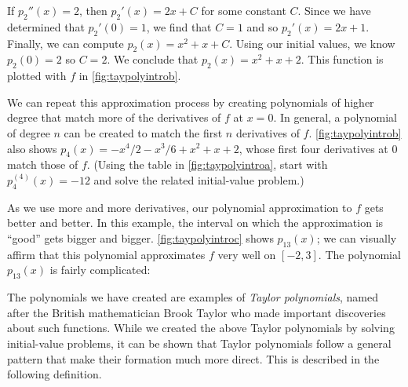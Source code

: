 If $p_2''(x) = 2$, then $p_2'(x) = 2x+C$ for some constant $C$. Since we have determined that $p_2'(0) = 1$, we find that $C=1$ and so $p_2'(x) = 2x+1$. Finally, we can compute $p_2(x) = x^2+x+C$. Using our initial values, we know $p_2(0) = 2$ so $C=2.$ We conclude that $p_2(x) = x^2+x+2.$ This function is plotted with $f$ in \autoref{fig:taypolyintrob}.

We can repeat this approximation process by creating polynomials of higher degree that match more of the derivatives of $f$ at $x=0$. In general, a polynomial of degree $n$ can be created to match the first $n$ derivatives of $f$. \autoref{fig:taypolyintrob} also shows $p_4(x)= -x^4/2-x^3/6+x^2+x+2$, whose first four derivatives at 0 match those of $f$. (Using the table in \autoref{fig:taypolyintroa}, start with $p_4^{(4)}(x)=-12$ and solve the related initial-value problem.)

As we use more and more derivatives, our polynomial approximation to $f$ gets better and better. In this example, the interval on which the approximation is ``good'' gets bigger and bigger. \autoref{fig:taypolyintroc} shows $p_{13}(x)$; we can visually affirm that this polynomial approximates $f$ very well on $[-2,3]$. The polynomial $p_{13}(x)$ is fairly complicated:\\

The polynomials we have created are examples of \emph{Taylor polynomials}, named after the British mathematician Brook Taylor who made important discoveries about such functions. While we created the above Taylor polynomials by solving initial-value problems, it can be shown that Taylor polynomials follow a general pattern that make their formation much more direct. This is described in the following definition.

